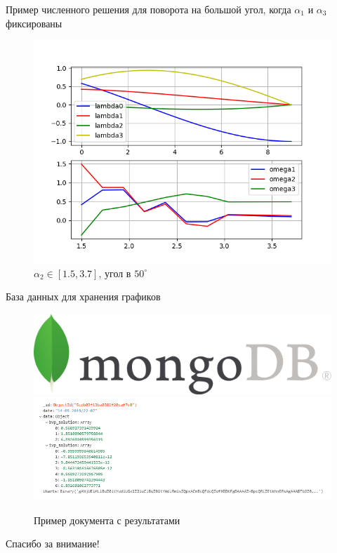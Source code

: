 \documentclass[10pt,utf8,presentation,notheorems,xcolor=dvipsnames,compress]{beamer}
\begin{document}
\begin{frame}{Пример численного решения для поворота на большой угол, когда $\alpha_1$ и $\alpha_3$ фиксированы}
\begin{figure}[H]
\center\includegraphics[scale=0.5]{fig/ivp_and_control_alpha2_1_5-3_7_50.png}
\caption{$\alpha_2 \in [1.5, 3.7]$, угол в $50^{\circ}$}
\end{figure}
\end{frame}

\begin{frame}{База данных для хранения графиков}
\begin{figure}[H]
\center\includegraphics[scale=0.5]{fig/MongoDB-Logo.png}
\center\includegraphics[scale=0.5]{fig/mongo_results.png}
\caption{Пример документа с результатами}
\end{figure}
\end{frame}

\begin{frame}[standout]
Спасибо за внимание!
\end{frame}
\end{document}
